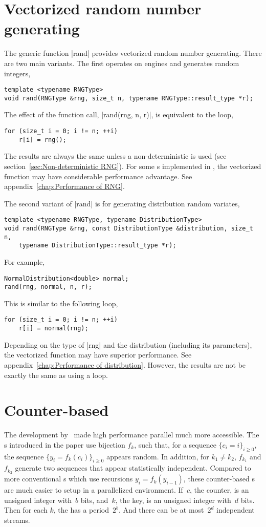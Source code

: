 \section{Vectorized random number generating}
\label{sec:Vectorized random number generating}

The generic function |rand| provides vectorized random number generating. There
are two main variants. The first operates on \rng engines and generates random
integers,
\begin{verbatim}
template <typename RNGType>
void rand(RNGType &rng, size_t n, typename RNGType::result_type *r);
\end{verbatim}
The effect of the function call, |rand(rng, n, r)|, is equivalent to the loop,
\begin{verbatim}
for (size_t i = 0; i != n; ++i)
    r[i] = rng();
\end{verbatim}
The results are always the same unless a non-deterministic \rng is used (see
section~\ref{sec:Non-deterministic RNG}). For some \rng{}s implemented in
\mckl, the vectorized function may have considerable performance advantage. See
appendix~\ref{chap:Performance of RNG}.

The second variant of |rand| is for generating distribution random variates,
\begin{verbatim}
template <typename RNGType, typename DistributionType>
void rand(RNGType &rng, const DistributionType &distribution, size_t n,
    typename DistributionType::result_type *r);
\end{verbatim}
For example,
\begin{verbatim}
NormalDistribution<double> normal;
rand(rng, normal, n, r);
\end{verbatim}
This is similar to the following loop,
\begin{verbatim}
for (size_t i = 0; i != n; ++i)
    r[i] = normal(rng);
\end{verbatim}
Depending on the type of |rng| and the distribution (including its parameters),
the vectorized function may have superior performance. See
appendix~\ref{chap:Performance of distribution}. However, the results are not
be exactly the same as using a loop.

\section{Counter-based \texorpdfstring{\rng}{RNG}}
\label{sec:Counter-based RNG}

The development by~\cite{Salmon:2011um} made high performance parallel \rng
much more accessible. The \rng{}s introduced in the paper use bijection $f_k$,
such that, for a sequence $\{c_i = i\}_{i\ge0}$, the sequence $\{y_i =
f_k(c_i)\}_{i\ge0}$ appears random. In addition, for $k_1 \ne k_2$, $f_{k_1}$
and $f_{k_2}$ generate two sequences that appear statistically independent.
Compared to more conventional \rng{}s which use recursions $y_i = f_k(y_{i -
1})$, these counter-based \rng{}s are much easier to setup in a parallelized
environment. If~$c$, the counter, is an unsigned integer with~$b$ bits,
and~$k$, the key, is an unsigned integer with~$d$ bits. Then for each $k$, the
\rng has a period~$2^b$. And there can be at most~$2^d$ independent streams.

